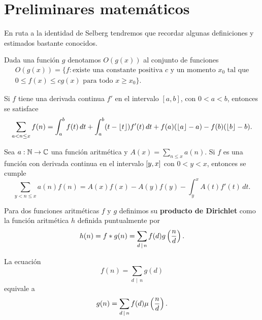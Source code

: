 \setlength{\headheight}{14.61858pt}
\pagestyle{fancy}

\chapter[Preliminares matem\'aticos]
{Preliminares matem\'aticos}
\label{ch:preliminaries}

En ruta a la identidad de Selberg
tendremos que recordar algunas definiciones y estimados bastante conocidos.

Dada una funci\'on \(g\) denotamos \(O(g(x))\) al conjunto de funciones
\[
  \begin{gathered}
    O(g(x)) = \{f : \text{existe una constante positiva } c \text{ y un momento } x_0 \text{ tal que} \\
    0 \leq f(x) \leq cg(x) \text{ para todo } x \geq x_0\}.
  \end{gathered}
\]

\begin{theorem}
\label{thm:euler}
Si \(f\) tiene una derivada continua \(f'\) en el intervalo \([a, b]\),
con \(0 < a < b\), entonces se satisface
\[
  \sum_{a < n \leq x} f(n) = \int_a^b f(t) \, dt +
  \int_a^b (t - \left\lfloor t \right\rfloor) f'(t) \, dt +
  f(a)(\left\lfloor a \right\rfloor - a) - f(b)(\left\lfloor b \right\rfloor - b).
\]
\end{theorem}

\begin{theorem}
\label{thm:abel}
Sea \(a: \mathbb{N} \to \mathbb{C}\) una funci\'on aritm\'etica y
\(A(x) = \sum_{n \leq x} a(n)\).
Si \(f\) es una funci\'on con derivada continua en el intervalo
\(\left[ y, x \right]\) con \(0 < y < x\), entonces se cumple
\[
  \sum_{y < n \leq x} a(n) f(n) = A(x) f(x) - A(y) f(y) - \int_y^x A(t) f'(t) \, dt.  
\]
\end{theorem}

Para dos funciones aritm\'eticas \(f\) y \(g\)
definimos su \textbf{producto de Dirichlet} como la funci\'on aritm\'etica
\(h\) definida puntualmente por 
\[
  h(n)
  = f * g(n)
  = \sum_{d \, \mid \, n} f(d) g \left( \frac{n}{d} \right).
\]

\begin{theorem}
  \label{thm:mobius}
  La ecuaci\'on
  \[
    f(n) = \sum_{d \, \mid \, n} g(d)  
  \]
  equivale a
  \[
    g(n) = \sum_{d \, \mid \, n} f(d) \mu \left( \frac{n}{d} \right).
  \]
\end{theorem}

